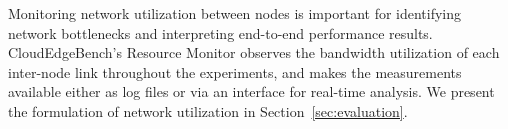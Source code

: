 \documentclass[runningheads]{llncs}
\begin{document}
Monitoring network utilization between nodes is important for identifying network bottlenecks and interpreting end-to-end performance results.
CloudEdgeBench's Resource Monitor observes the bandwidth utilization of each inter-node link throughout the experiments, and makes the measurements available either as log files or via an interface for real-time analysis.
We present the formulation of network utilization in Section~\ref{sec:evaluation}.




\end{document}
